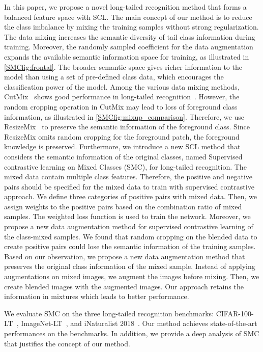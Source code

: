 \documentclass[10pt,twocolumn,letterpaper]{article}
\begin{document}
In this paper, we propose a novel long-tailed recognition method that forms a balanced feature space with SCL. The main concept of our method is to reduce the class imbalance by mixing the training samples without strong regularization.
The data mixing increases the semantic diversity of tail class information during training. Moreover, the randomly sampled coefficient for the data augmentation expands the available semantic information space for training, as illustrated in \cref{SMCfig:frontal}.
The broader semantic space gives richer information to the model than using a set of pre-defined class data, which encourages the classification power of the model.
Among the various data mixing methods, CutMix~\cite{CutMix} shows good performance in long-tailed recognition~\cite{CMO}. However, the random cropping operation in CutMix may lead to loss of foreground class information, as illustrated in \cref{SMCfig:mixup_comparison}. Therefore, we use ResizeMix~\cite{ResizeMix} to preserve the semantic information of the foreground class. Since ResizeMix omits random cropping for the foreground patch, the foreground knowledge is preserved.
Furthermore, we introduce a new SCL method that considers the semantic information of the original classes, named Supervised contrastive learning on Mixed Classes (SMC), for long-tailed recognition.
The mixed data contain multiple class features. Therefore, the positive and negative pairs should be specified for the mixed data to train with supervised contrastive approach.
We define three categories of positive pairs with mixed data.
Then, we assign weights to the positive pairs based on the combination ratio of mixed samples. The weighted loss function is used to train the network.
Moreover, we propose a new data augmentation method for supervised contrastive learning of the class-mixed samples. 
We found that random cropping on the blended data to create positive pairs could lose the semantic information of the training samples.
Based on our observation, we propose a new data augmentation method that preserves the original class information of the mixed sample. Instead of applying augmentations on mixed images, we augment the images before mixing. Then, we create blended images with the augmented images. Our approach retains the information in mixtures which leads to better performance.

We evaluate SMC on the three long-tailed recognition benchmarks: CIFAR-100-LT~\cite{CIFAR-LT}, ImageNet-LT~\cite{ImageNet-LT}, and iNaturalist 2018~\cite{iNaturalist}. Our method achieves state-of-the-art performances on the benchmarks. In addition, we provide a deep analysis of SMC that justifies the concept of our method.
\end{document}
